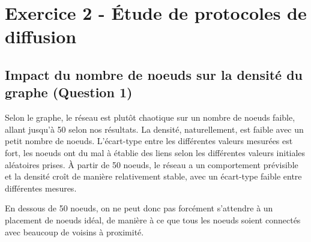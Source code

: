\documentclass[a4paper]{article}
\begin{document}
\section{Exercice 2 - Étude de protocoles de diffusion}
\subsection{Impact du nombre de noeuds sur la densité du
  graphe (Question 1)}
\begin{minipage}{0.6\textwidth}
  Selon le graphe, le réseau est plutôt chaotique sur un nombre de
  noeuds faible, allant jusqu'à 50 selon nos résultats. La densité,
  naturellement, est faible avec un petit nombre de noeuds. L'écart-type
  entre les différentes valeurs mesurées est fort, les noeuds ont du
  mal à établie des liens selon les différentes valeurs
  initiales aléatoires prises. À partir de 50 noeuds, le réseau a un
  comportement prévisible et la densité croît de manière relativement
  stable, avec un écart-type faible entre différentes mesures.

  En dessous de 50 noeuds, on ne peut donc pas forcément s'attendre à
  un placement de noeuds idéal, de manière à ce que tous les noeuds
  soient connectés avec beaucoup de voisins à proximité.
  \vfill
\end{minipage}%
\hfill
\end{document}
